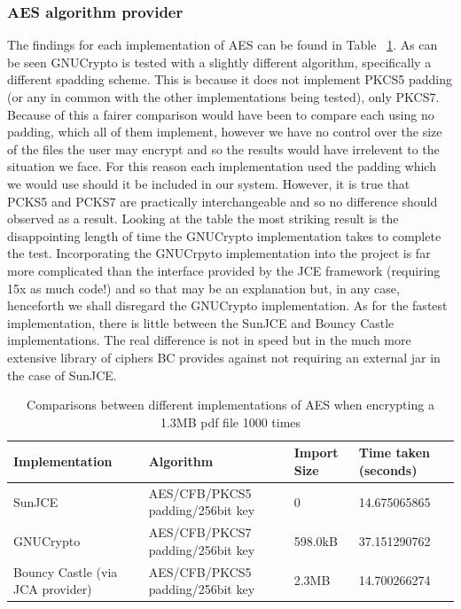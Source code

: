\documentclass[12pt, titlepage]{article}
\begin{document}
\subsubsection*{AES algorithm provider}
The findings for each implementation of AES can be found in Table ~\ref{tab:aesComparison}. As can be seen GNUCrypto is tested with a slightly different algorithm, specifically a different spadding scheme. This is because it does not implement PKCS5 padding (or any in common with the other implementations being tested), only PKCS7. Because of this a fairer comparison would have been to compare each using no padding, which all of them implement, however we have no control over the size of the files the user may encrypt and so the results would have irrelevent to the situation we face. For this reason each implementation used the padding which we would use should it be included in our system. However, it is true that PCKS5 and PCKS7 are practically interchangeable and so no difference should observed as a result.
\newline Looking at the table the most striking result is the disappointing length of time the GNUCrypto implementation takes to complete the test. Incorporating the GNUCrpyto implementation into the project is far more complicated than the interface provided by the JCE framework (requiring 15x as much code!) and so that may be an explanation but, in any case, henceforth we shall disregard the GNUCrypto implementation. As for the fastest implementation, there is little between the SunJCE and Bouncy Castle implementations. The real difference is not in speed but in the much more extensive library of ciphers BC provides against not requiring an external jar in the case of SunJCE.

\begin{center}
\begin{table}
    \begin{tabular}{ | l | l | l | l |}
    \hline
    Implementation & Algorithm & Import Size & Time taken (seconds) \\ \hline
    
    SunJCE & AES/CFB/PKCS5 padding/256bit key & 0 & 14.675065865 \\ \hline
    
    GNUCrypto & AES/CFB/PKCS7 padding/256bit key & 598.0kB & 37.151290762 \\ \hline
    
     Bouncy Castle (via JCA provider) & AES/CFB/PKCS5 padding/256bit key & 2.3MB & 14.700266274 \\ \hline
    
    \end{tabular}
    \caption{Comparisons between different implementations of AES when encrypting a 1.3MB pdf file 1000 times} \label{tab:aesComparison}
    \end{table}
\end{center}
\end{document}
